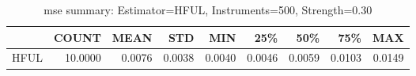 \begin{table}[ht]
\centering
\caption{mse summary: Estimator=HFUL, Instruments=500, Strength=0.30}
\begin{tabular}{lrrrrrrrr}
\toprule
 & COUNT & MEAN & STD & MIN & 25\% & 50\% & 75\% & MAX \\
\midrule
HFUL & 10.0000 & 0.0076 & 0.0038 & 0.0040 & 0.0046 & 0.0059 & 0.0103 & 0.0149 \\
\bottomrule
\end{tabular}
\end{table}
